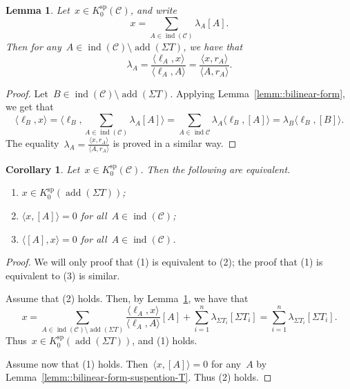\documentclass{amsart}
\newtheorem{corollary}[theorem]{Corollary}
\newtheorem{lemma}[theorem]{Lemma}
\theoremstyle{definition}
\newcommand{\cat}{\mathcal{C}}
\newcommand{\susp}{\Sigma}
\newcommand{\add}{\operatorname{add}}
\newcommand{\spl}{\operatorname{sp}}
\newcommand{\Ksp}{K_0^{\spl}}
\newcommand{\ind}{\operatorname{ind}}
\begin{document}
\begin{lemma}\label{lemm::coefficients}
 Let~$x\in \Ksp(\cat)$, and write~\[x=\sum_{A\in \ind(\cat)} \lambda_A [A].\]  Then for any~$A\in\ind(\cat)\setminus \add(\susp T)$, we have that
 \[
  \lambda_A = \frac{\langle \ell_A, x \rangle}{\langle \ell_A, A \rangle} = \frac{\langle x, r_A \rangle}{\langle A, r_A \rangle}.
 \]
\end{lemma}
\begin{proof}
 Let~$B\in \ind(\cat) \setminus \add(\susp T)$.  Applying Lemma~\ref{lemm::bilinear-form}, we get that
 \[
  \langle \ell_B, x \rangle = \langle \ell_B, \sum_{A\in \ind(\cat)} \lambda_A [A] \rangle = \sum_{A\in \ind{\cat}} \lambda_A \langle \ell_B, [A] \rangle = \lambda_B \langle \ell_B, [B] \rangle.
 \]
 The equality~$\lambda_A = \frac{\langle x, r_A \rangle}{\langle A, r_A \rangle}$ is proved in a similar way.
\end{proof}

\begin{corollary}\label{lemm::test-susp-T}
 Let~$x\in \Ksp(\cat)$.  Then the following are equivalent.
 \begin{enumerate}
  \item $x\in \Ksp(\add(\susp T))$;
  \item $\langle x, [A]\rangle = 0$ for all~$A\in \ind(\cat)$;
  \item $\langle [A], x \rangle = 0$ for all~$A\in \ind(\cat)$.
 \end{enumerate}
\end{corollary}
\begin{proof}
 We will only proof that (1) is equivalent to (2); the proof that (1) is equivalent to (3) is similar.  
 
 Assume that (2) holds.  Then, by Lemma~\ref{lemm::coefficients}, we have that
 \[
  x = \sum_{A\in \ind(\cat)\setminus \add(\susp T)} \frac{\langle \ell_A, x \rangle}{\langle \ell_A, A \rangle}[A] + \sum_{i=1}^n \lambda_{\susp T_i} [\susp T_i] = \sum_{i=1}^n \lambda_{\susp T_i} [\susp T_i].
 \]
 Thus~$x\in \Ksp(\add(\susp T))$, and (1) holds.
 
 Assume now that (1) holds.  Then~$\langle x, [A]\rangle = 0$ for any~$A$ by Lemma~\ref{lemm::bilinear-form-suspention-T}.  Thus (2) holds.
\end{proof}
\end{document}
